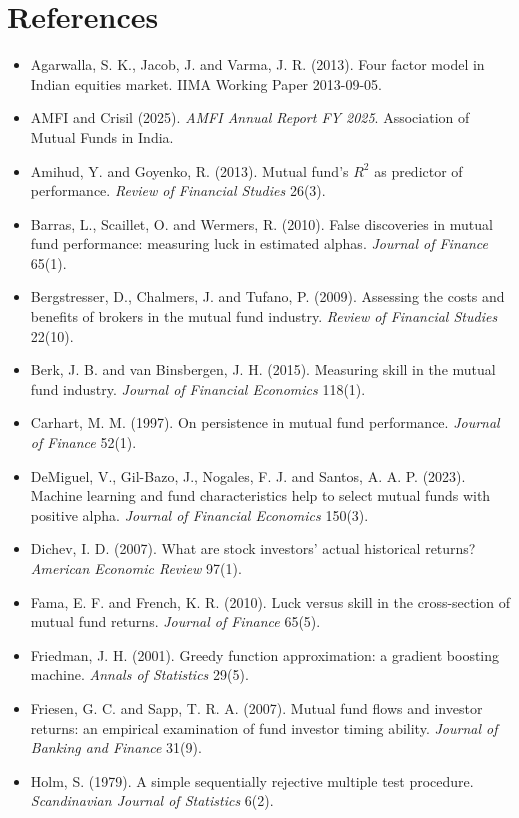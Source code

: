 \documentclass[11pt]{article}
\begin{document}
\section*{References}
\begin{small}
\begin{itemize}[leftmargin=1em,label={}]
\item Agarwalla, S. K., Jacob, J. and Varma, J. R. (2013). Four factor model in Indian equities market. IIMA Working Paper 2013-09-05.
\item AMFI and Crisil (2025). \textit{AMFI Annual Report FY 2025}. Association of Mutual Funds in India.
\item Amihud, Y. and Goyenko, R. (2013). Mutual fund's $R^2$ as predictor of performance. \textit{Review of Financial Studies} 26(3).
\item Barras, L., Scaillet, O. and Wermers, R. (2010). False discoveries in mutual fund performance: measuring luck in estimated alphas. \textit{Journal of Finance} 65(1).
\item Bergstresser, D., Chalmers, J. and Tufano, P. (2009). Assessing the costs and benefits of brokers in the mutual fund industry. \textit{Review of Financial Studies} 22(10).
\item Berk, J. B. and van Binsbergen, J. H. (2015). Measuring skill in the mutual fund industry. \textit{Journal of Financial Economics} 118(1).
\item Carhart, M. M. (1997). On persistence in mutual fund performance. \textit{Journal of Finance} 52(1).
\item DeMiguel, V., Gil-Bazo, J., Nogales, F. J. and Santos, A. A. P. (2023). Machine learning and fund characteristics help to select mutual funds with positive alpha. \textit{Journal of Financial Economics} 150(3).
\item Dichev, I. D. (2007). What are stock investors' actual historical returns? \textit{American Economic Review} 97(1).
\item Fama, E. F. and French, K. R. (2010). Luck versus skill in the cross-section of mutual fund returns. \textit{Journal of Finance} 65(5).
\item Friedman, J. H. (2001). Greedy function approximation: a gradient boosting machine. \textit{Annals of Statistics} 29(5).
\item Friesen, G. C. and Sapp, T. R. A. (2007). Mutual fund flows and investor returns: an empirical examination of fund investor timing ability. \textit{Journal of Banking and Finance} 31(9).
\item Holm, S. (1979). A simple sequentially rejective multiple test procedure. \textit{Scandinavian Journal of Statistics} 6(2).

\end{itemize}
\end{small}
\end{document}
